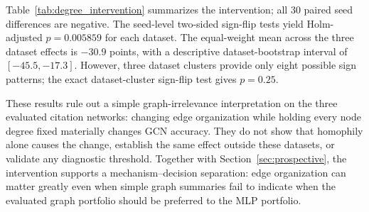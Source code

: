 Table~\ref{tab:degree_intervention} summarizes the intervention; all 30 paired seed differences are negative. The seed-level two-sided sign-flip tests yield Holm-adjusted $p=0.005859$ for each dataset. The equal-weight mean across the three dataset effects is $-30.9$ points, with a descriptive dataset-bootstrap interval of $[-45.5,-17.3]$. However, three dataset clusters provide only eight possible sign patterns; the exact dataset-cluster sign-flip test gives $p=0.25$.

These results rule out a simple graph-irrelevance interpretation on the three evaluated citation networks: changing edge organization while holding every node degree fixed materially changes GCN accuracy. They do not show that homophily alone causes the change, establish the same effect outside these datasets, or validate any diagnostic threshold. Together with Section~\ref{sec:prospective}, the intervention supports a mechanism--decision separation: edge organization can matter greatly even when simple graph summaries fail to indicate when the evaluated graph portfolio should be preferred to the MLP portfolio.
